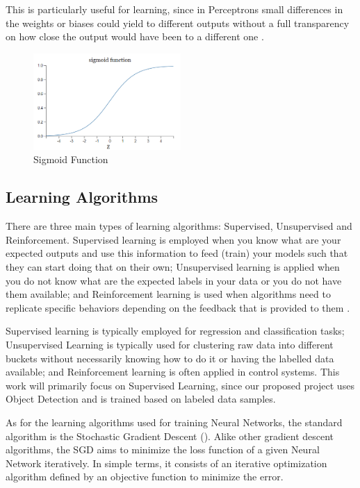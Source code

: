 \documentclass[openright]{normas-utf-tex} %
\begin{document}
This is particularly useful for learning, since in Perceptrons small differences in the 
weights or biases could yield to different outputs without a full transparency 
on how close the output would have been to a different one \cite{Nielsen2015}.

\begin{figure}[H]
	\centering
	\includegraphics[width=0.5\textwidth]{./images/sigmoid-function.png}
	\caption[Sigmoid Function]{Sigmoid Function}
	\label{fig:sigmoid}
\end{figure}

\subsection{Learning Algorithms}

There are three main types of learning algorithms: Supervised, Unsupervised and Reinforcement.
Supervised learning is employed when you know what are your expected outputs and use this
information to feed (train) your models such that they can start doing that on their own; 
Unsupervised learning is applied when you do not know what are the expected labels 
in your data or you do not have them available; and Reinforcement learning is used when
algorithms need to replicate specific behaviors depending on the feedback that is
provided to them \cite{CourseraML}. 

Supervised learning is typically employed for regression and classification tasks; 
Unsupervised Learning is typically used for clustering raw data into different buckets
without necessarily knowing how to do it or having the labelled data available;
and Reinforcement learning is often applied in control systems.
This work will primarily focus on Supervised Learning, since our proposed project uses
Object Detection and is trained based on labeled data samples.

As for the learning algorithms used for training Neural Networks, 
the standard algorithm is the Stochastic Gradient Descent ().
Alike other gradient descent algorithms, the SGD aims to minimize the loss function of a given
Neural Network iteratively. In simple terms, it consists of an iterative optimization algorithm defined by an
objective function to minimize the error.
\end{document}
